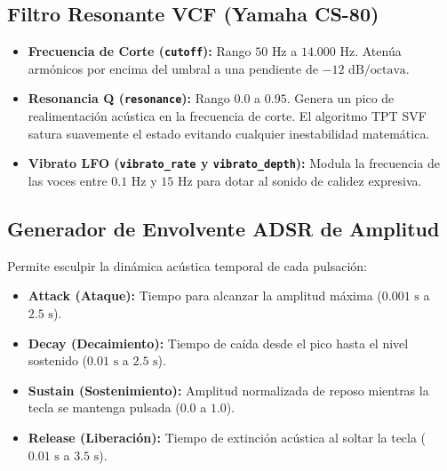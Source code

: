 \documentclass[11pt,a4paper]{article}
\begin{document}
\subsection{Filtro Resonante VCF (Yamaha CS-80)}
\begin{itemize}[leftmargin=1.5cm]
    \item \textbf{Frecuencia de Corte (\texttt{cutoff}):} Rango $50\text{ Hz}$ a $14.000\text{ Hz}$. Atenúa armónicos por encima del umbral a una pendiente de $-12\text{ dB/octava}$.
    \item \textbf{Resonancia Q (\texttt{resonance}):} Rango $0.0$ a $0.95$. Genera un pico de realimentación acústica en la frecuencia de corte. El algoritmo TPT SVF satura suavemente el estado evitando cualquier inestabilidad matemática.
    \item \textbf{Vibrato LFO (\texttt{vibrato\_rate} y \texttt{vibrato\_depth}):} Modula la frecuencia de las voces entre $0.1\text{ Hz}$ y $15\text{ Hz}$ para dotar al sonido de calidez expresiva.
\end{itemize}

\subsection{Generador de Envolvente ADSR de Amplitud}
Permite esculpir la dinámica acústica temporal de cada pulsación:
\begin{itemize}[leftmargin=1.5cm]
    \item \textbf{Attack (Ataque):} Tiempo para alcanzar la amplitud máxima ($0.001\text{ s}$ a $2.5\text{ s}$).
    \item \textbf{Decay (Decaimiento):} Tiempo de caída desde el pico hasta el nivel sostenido ($0.01\text{ s}$ a $2.5\text{ s}$).
    \item \textbf{Sustain (Sostenimiento):} Amplitud normalizada de reposo mientras la tecla se mantenga pulsada ($0.0$ a $1.0$).
    \item \textbf{Release (Liberación):} Tiempo de extinción acústica al soltar la tecla ($0.01\text{ s}$ a $3.5\text{ s}$).
\end{itemize}
\end{document}
